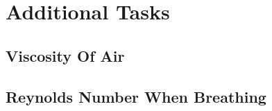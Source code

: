 \section{Additional Tasks}
\subsection{Viscosity Of Air}


\subsection{Reynolds Number When Breathing}